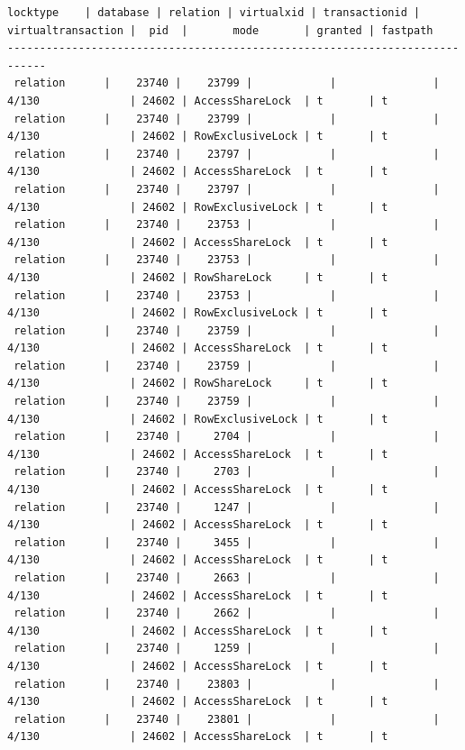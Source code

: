 \documentclass{article}
\begin{document}
\begin{lstlisting}[basicstyle=\tiny]
   locktype    | database | relation | virtualxid | transactionid | virtualtransaction |  pid  |       mode       | granted | fastpath
----------------------------------------------------------------------------
 relation      |    23740 |    23799 |            |               | 4/130              | 24602 | AccessShareLock  | t       | t
 relation      |    23740 |    23799 |            |               | 4/130              | 24602 | RowExclusiveLock | t       | t
 relation      |    23740 |    23797 |            |               | 4/130              | 24602 | AccessShareLock  | t       | t
 relation      |    23740 |    23797 |            |               | 4/130              | 24602 | RowExclusiveLock | t       | t
 relation      |    23740 |    23753 |            |               | 4/130              | 24602 | AccessShareLock  | t       | t
 relation      |    23740 |    23753 |            |               | 4/130              | 24602 | RowShareLock     | t       | t
 relation      |    23740 |    23753 |            |               | 4/130              | 24602 | RowExclusiveLock | t       | t
 relation      |    23740 |    23759 |            |               | 4/130              | 24602 | AccessShareLock  | t       | t
 relation      |    23740 |    23759 |            |               | 4/130              | 24602 | RowShareLock     | t       | t
 relation      |    23740 |    23759 |            |               | 4/130              | 24602 | RowExclusiveLock | t       | t
 relation      |    23740 |     2704 |            |               | 4/130              | 24602 | AccessShareLock  | t       | t
 relation      |    23740 |     2703 |            |               | 4/130              | 24602 | AccessShareLock  | t       | t
 relation      |    23740 |     1247 |            |               | 4/130              | 24602 | AccessShareLock  | t       | t
 relation      |    23740 |     3455 |            |               | 4/130              | 24602 | AccessShareLock  | t       | t
 relation      |    23740 |     2663 |            |               | 4/130              | 24602 | AccessShareLock  | t       | t
 relation      |    23740 |     2662 |            |               | 4/130              | 24602 | AccessShareLock  | t       | t
 relation      |    23740 |     1259 |            |               | 4/130              | 24602 | AccessShareLock  | t       | t
 relation      |    23740 |    23803 |            |               | 4/130              | 24602 | AccessShareLock  | t       | t
 relation      |    23740 |    23801 |            |               | 4/130              | 24602 | AccessShareLock  | t       | t

\end{lstlisting}
\end{document}
